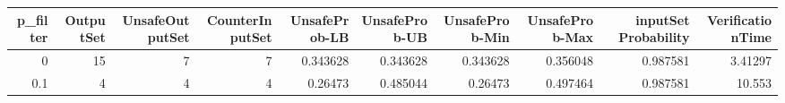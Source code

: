 \begin{tabular}{rrrrrrrrrr}
\hline
   p\_filter &   OutputSet &   UnsafeOutputSet &   CounterInputSet &   UnsafeProb-LB &   UnsafeProb-UB &   UnsafeProb-Min &   UnsafeProb-Max &   inputSet Probability &   VerificationTime \\
\hline
        0   &          15 &                 7 &                 7 &        0.343628 &        0.343628 &         0.343628 &         0.356048 &               0.987581 &            3.41297 \\
        0.1 &           4 &                 4 &                 4 &        0.26473  &        0.485044 &         0.26473  &         0.497464 &               0.987581 &           10.553   \\
\hline
\end{tabular}
